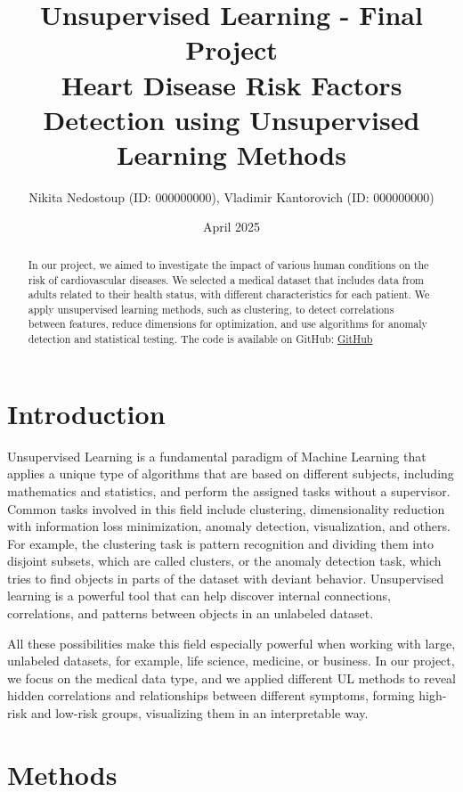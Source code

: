 \documentclass[12pt, a4paper]{article}
\title{Unsupervised Learning - Final Project\\
{\large Heart Disease Risk Factors Detection using Unsupervised Learning Methods}}
\author{\small Nikita Nedostoup (ID: 000000000), Vladimir Kantorovich (ID: 000000000)}
\date{April 2025}
\begin{document}
\maketitle
\begin{abstract}
	In our project, we aimed to investigate the impact of various human conditions on the risk of cardiovascular diseases. We selected a medical dataset that includes data from adults related to their health status, with different characteristics for each patient. We apply unsupervised learning methods, such as clustering, to detect correlations between features, reduce dimensions for optimization, and use algorithms for anomaly detection and statistical testing. The code is available on GitHub: \href{https://github.com/VigaNik/HeartDiseaseUnsupervisedLearning.git}{GitHub}
\end{abstract}
\section{Introduction}
\hspace*{1em}
	Unsupervised Learning is a fundamental paradigm of Machine Learning that applies a unique type of algorithms that are based on different subjects, including mathematics and statistics, and perform the assigned tasks without a supervisor. Common tasks involved in this field include clustering, dimensionality reduction with information loss minimization, anomaly detection, visualization, and others. For example, the clustering task is pattern recognition and dividing them into disjoint subsets, which are called clusters, or the anomaly detection task, which tries to find objects in parts of the dataset with deviant behavior. Unsupervised learning is a powerful tool that can help discover internal connections, correlations, and patterns between objects in an unlabeled dataset. 

	All these possibilities make this field especially powerful when working with large, unlabeled datasets, for example, life science, medicine, or business.  In our project, we focus on the medical data type, and we applied different UL methods to reveal hidden correlations and relationships between different symptoms, forming high-risk and low-risk groups, visualizing them in an interpretable way.
\section{Methods}
\end{document}
